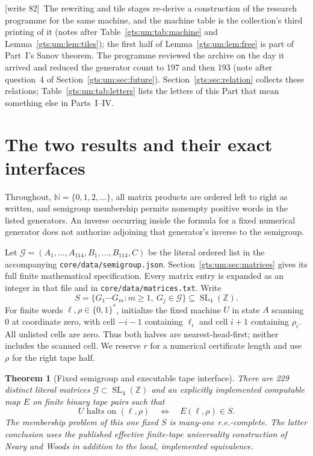 \documentclass[11pt,letterpaper]{article}
\newtheorem{theorem}{Theorem}[section]
\theoremstyle{definition}
\theoremstyle{remark}
\newcommand{\Z}{\mathbb Z}
\newcommand{\N}{\mathbb N}
\newcommand{\SL}{\operatorname{SL}}
\newcommand{\code}[1]{\nolinkurl{#1}}
\newcommand{\wtagc}{\textup{[write 82]}}
\begin{document}
\wtagc\ The rewriting and tile stages re-derive a construction of the research programme for the same machine, and the machine table is the collection's third printing of it (notes after Table~\ref{gts:um:tab:machine} and Lemma~\ref{gts:um:lem:tiles}); the first half of Lemma~\ref{gts:um:lem:free} is part of Part~I's Sanov theorem. The programme reviewed the archive on the day it arrived and reduced the generator count to 197 and then 193 (note after question~4 of Section~\ref{gts:um:sec:future}). Section~\ref{gts:sec:relation} collects these relations; Table~\ref{gts:um:tab:letters} lists the letters of this Part that mean something else in Parts~I--IV.

\section{The two results and their exact interfaces}
\label{gts:um:sec:main}
Throughout, $\N=\{0,1,2,\ldots\}$, all matrix products are ordered left to right as written, and semigroup membership permits nonempty positive words in the listed generators. An inverse occurring inside the formula for a fixed numerical generator does not authorize adjoining that generator's inverse to the semigroup.

Let $\mathcal G=(A_1,\ldots,A_{114},B_1,\ldots,B_{114},C)$ be the literal ordered list in the accompanying \code{core/data/semigroup.json}. Section~\ref{gts:um:sec:matrices} gives its full finite mathematical specification. Every matrix entry is expanded as an integer in that file and in \code{core/data/matrices.txt}. Write
\[
 S=\{G_1\cdots G_m:m\geq1,\ G_j\in\mathcal G\}\subseteq\SL_4(\Z).
\]
For finite words $\ell,\rho\in\{0,1\}^{*}$, initialize the fixed machine $U$ in state $A$ scanning $0$ at coordinate zero, with cell $-i-1$ containing $\ell_i$ and cell $i+1$ containing $\rho_i$. All unlisted cells are zero. Thus both halves are nearest-head-first; neither includes the scanned cell. We reserve $r$ for a numerical certificate length and use $\rho$ for the right tape half.

\begin{theorem}[Fixed semigroup and executable tape interface]
\label{gts:um:thm:semigroup}
There are 229 distinct literal matrices $\mathcal G\subset\SL_4(\Z)$ and an explicitly implemented computable map $E$ on finite binary tape pairs such that
\[
 U\text{ halts on }(\ell,\rho)\quad\Longleftrightarrow\quad E(\ell,\rho)\in S.
\]
The membership problem of this one fixed $S$ is many-one r.e.-complete. The latter conclusion uses the published effective finite-tape universality construction of Neary and Woods in addition to the local, implemented equivalence.
\end{theorem}
\end{document}
